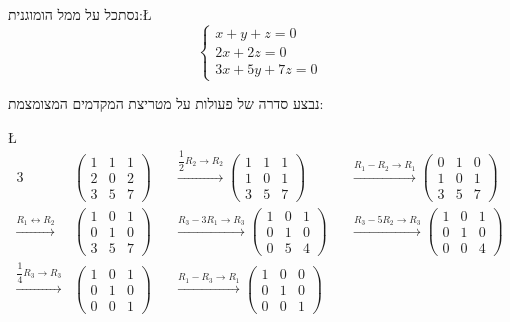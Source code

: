 \begin{example}
נסתכל על ממ\textquotedbl ל הומוגנית:\L{%
\[
\begin{cases}
x+y+z=0\\
2x+2z=0\\
3x+5y+7z=0
\end{cases}
\]
}%

נבצע סדרה של פעולות על מטריצת המקדמים המצומצמת:

\L{%
	\begin{alignat*}{3}
		&\begin{pmatrix} 1 & 1 & 1 \\ 2 & 0 & 2 \\ 3 & 5 & 7 \end{pmatrix}
		&&\xrightarrow{\dfrac{1}{2}R_2 \to R_2}
		\begin{pmatrix} 1 & 1 & 1 \\ 1 & 0 & 1 \\ 3 & 5 & 7 \end{pmatrix}
		&&\xrightarrow{R_1 - R_2 \to R_1}
		\begin{pmatrix} 0 & 1 & 0 \\ 1 & 0 & 1 \\ 3 & 5 & 7 \end{pmatrix} \\
		\xrightarrow{R_1 \leftrightarrow R_2}&\begin{pmatrix} 1 & 0 & 1 \\ 0 & 1 & 0 \\ 3 & 5 & 7 \end{pmatrix}
		&&\xrightarrow{R_3 - 3R_1 \to R_3}
		\begin{pmatrix} 1 & 0 & 1 \\ 0 & 1 & 0 \\ 0 & 5 & 4 \end{pmatrix}
		&&\xrightarrow{R_3 - 5R_2 \to R_3}
		\begin{pmatrix} 1 & 0 & 1 \\ 0 & 1 & 0 \\ 0 & 0 & 4 \end{pmatrix} \\
		\xrightarrow{\dfrac{1}{4}R_3 \to R_3}&\begin{pmatrix} 1 & 0 & 1 \\ 0 & 1 & 0 \\ 0 & 0 & 1 \end{pmatrix}
		&&\xrightarrow{R_1 - R_3 \to R_1}
		\begin{pmatrix} 1 & 0 & 0 \\ 0 & 1 & 0 \\ 0 & 0 & 1 \end{pmatrix}
		&&
	\end{alignat*}
}%


\end{example}
